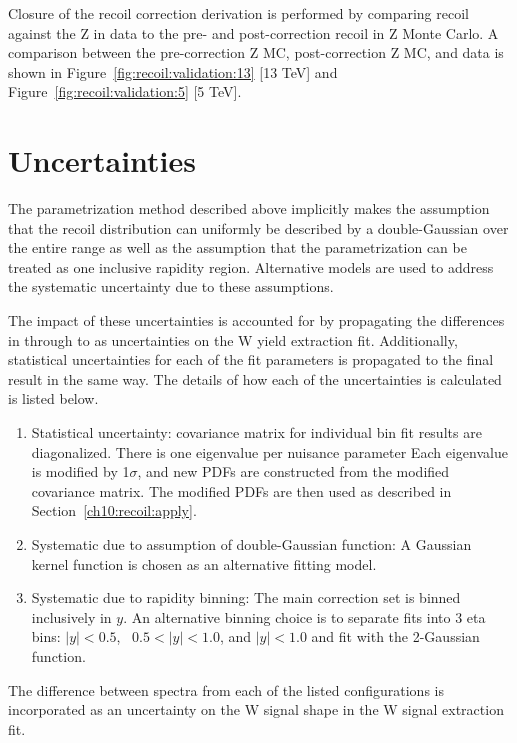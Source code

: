 


Closure of the recoil correction derivation is performed by comparing recoil against the Z in data to the pre- and post-correction recoil in Z Monte Carlo. A comparison between the pre-correction Z MC, post-correction Z MC, and data is shown in Figure~\ref{fig:recoil:validation:13} [13 TeV] and Figure~\ref{fig:recoil:validation:5} [5 TeV].







\section{Uncertainties}\label{ch:recoil:unc}
The parametrization method described above implicitly makes the assumption that the recoil distribution can uniformly be described by a double-Gaussian over the entire \pt range as well as the assumption that the parametrization can be treated as one inclusive rapidity region. Alternative models are used to address the systematic uncertainty due to these assumptions. 

The impact of these uncertainties is accounted for by propagating the differences in \met through \mt to as uncertainties on the W yield extraction fit. Additionally, statistical uncertainties for each of the fit parameters is propagated to the final result in the same way.
The details of how each of the uncertainties is calculated is listed below.
\begin{enumerate}
    \item Statistical uncertainty: covariance matrix for individual bin fit results are diagonalized. There is one eigenvalue per nuisance parameter Each eigenvalue is modified by 1$\sigma$, and new PDFs are constructed from the modified covariance matrix. The modified PDFs are then used as described in Section~\ref{ch10:recoil:apply}. 
    \item Systematic due to assumption of double-Gaussian function: A Gaussian kernel function is chosen as an alternative fitting model. 
    \item Systematic due to rapidity binning: The main correction set is binned inclusively in $y$. An alternative binning choice is to separate fits into 3 eta bins: $|y|<0.5$,~ $0.5 <  |y| < 1.0$, and $|y| < 1.0$ and fit with the 2-Gaussian function. 
\end{enumerate}
 
The difference between \met spectra from each of the listed configurations is incorporated as an uncertainty on the W signal shape in the W signal extraction fit.